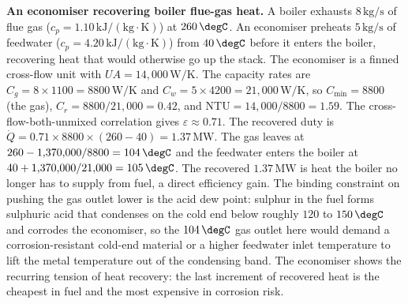 \textbf{An economiser recovering boiler flue-gas heat.} A boiler
exhausts $8\,\text{kg/s}$ of flue gas ($c_p = 1.10\,\text{kJ}/(\text{kg}
\cdot\si{\kelvin})$) at $260\,\degC$. An economiser preheats $5\,\text{
kg/s}$ of feedwater ($c_p = 4.20\,\text{kJ}/(\text{kg}\cdot\si{\kelvin})$)
from $40\,\degC$ before it enters the boiler, recovering heat that would
otherwise go up the stack. The economiser is a finned cross-flow unit
with $UA = 14{,}000\,\text{W}/\si{\kelvin}$. The capacity rates are
$C_g = 8 \times 1100 = 8800\,\si{\watt\per\kelvin}$ and $C_w = 5 \times
4200 = 21{,}000\,\si{\watt\per\kelvin}$, so $C_{\min} = 8800$ (the gas),
$C_r = 8800/21{,}000 = 0.42$, and $\text{NTU} = 14{,}000/8800 = 1.59$.
The cross-flow-both-unmixed correlation gives $\varepsilon \approx 0.71$.
The recovered duty is $\dot{Q} = 0.71 \times 8800 \times (260 - 40) =
1.37\,\text{MW}$. The gas leaves at $260 - 1{,}370{,}000/8800 = 104\,
\degC$ and the feedwater enters the boiler at $40 + 1{,}370{,}000/
21{,}000 = 105\,\degC$. The recovered $1.37\,\text{MW}$ is heat the
boiler no longer has to supply from fuel, a direct efficiency gain. The
binding constraint on pushing the gas outlet lower is the acid dew point:
sulphur in the fuel forms sulphuric acid that condenses on the cold end
below roughly $120$ to $150\,\degC$ and corrodes the economiser, so the
$104\,\degC$ gas outlet here would demand a corrosion-resistant cold-end
material or a higher feedwater inlet temperature to lift the metal
temperature out of the condensing band. The economiser shows the
recurring tension of heat recovery: the last increment of recovered heat
is the cheapest in fuel and the most expensive in corrosion risk.


